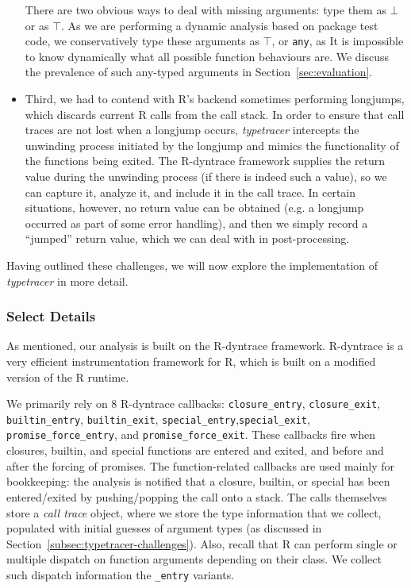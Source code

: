 \documentclass[acmsmall,review,anonymous]{acmart}\settopmatter{printfolios=true,printccs=false,printacmref=false}
\newcommand{\code}[1]{{\lstinline[style=Rin]!#1!}\xspace}
\newcommand{\typetracer}{\emph{typetracer}\xspace} %
\begin{document}
\begin{itemize}
There are two obvious ways to deal with missing arguments: type them as $\bot$
or as $\top$.  As we are performing a dynamic analysis based on package test
code, we conservatively type these arguments as $\top$, or \code{any}, as It is
impossible to know dynamically what all possible function behaviours are.
We discuss the prevalence of such any-typed arguments in
Section~\ref{sec:evaluation}.

\item Third, we had to contend with R's backend sometimes
  performing longjumps, which discards current R calls from the call stack.
  In order to ensure that call traces are not lost when a longjump occurs,
  \typetracer intercepts the unwinding process initiated by the longjump and
  mimics the functionality of the functions being exited.  The R-dyntrace
  framework supplies the return value during the unwinding process (if there
  is indeed such a value), so we can capture it, analyze it, and include it
  in the call trace.  In certain situations, however, no return value can be
  obtained (e.g. a longjump occurred as part of some error handling), and
  then we simply record a ``jumped'' return value, which we can deal with in
  post-processing.  
\end{itemize}

Having outlined these challenges, we will now explore the implementation of \typetracer in more detail.

%
%
\subsubsection{Select Details}

As mentioned, our analysis is built on the R-dyntrace framework.  R-dyntrace
is a very efficient instrumentation framework for R, which is built on a
modified version of the R runtime. 

We primarily rely on 8 R-dyntrace callbacks: \texttt{closure\_entry},
\texttt{closure\_exit}, \texttt{builtin\_entry}, \texttt{builtin\_exit},
\texttt{special\_entry},\texttt{special\_exit},
\texttt{promise\_force\_entry}, and \texttt{promise\_force\_exit}.  These
callbacks fire when closures, builtin, and special functions are entered and
exited, and before and after the forcing of promises.  The function-related
callbacks are used mainly for bookkeeping: the analysis is notified that a
closure, builtin, or special has been entered/exited by pushing/popping the
call onto a stack.  The calls themselves store a {\it call trace} object,
where we store the type information that we collect, populated with initial
guesses of argument types (as discussed in
Section~\ref{subsec:typetracer-challenges}).  
Also, recall that R can perform single or multiple dispatch on function arguments depending on their class.
We collect such dispatch information the {\tt \_entry} variants.
\end{document}
